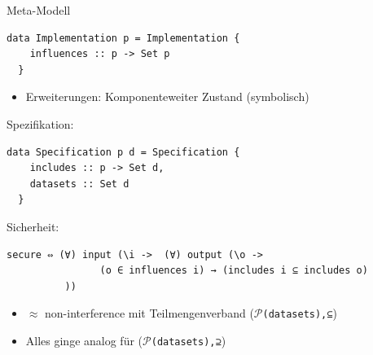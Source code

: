 \documentclass[18pt]{beamer}
\newcommand{\kit}[1]{\textcolor{kit-green100}{#1}}
\begin{document}
\begin{frame}[fragile,t]{Meta-Modell}
\begin{overprint}
\begin{minipage}[t]{5cm}
\begin{verbatim}
data Implementation p = Implementation {
    influences :: p -> Set p
  }
\end{verbatim}
\end{minipage}
\begin{minipage}[t]{6cm}
\begin{itemize}
  \item Erweiterungen: Komponenteweiter Zustand (symbolisch)
\end{itemize}
\end{minipage}
\kit{Spezifikation:}
\begin{minipage}[t]{8cm}
\begin{verbatim}
data Specification p d = Specification {
    includes :: p -> Set d,
    datasets :: Set d
  }
\end{verbatim}
\end{minipage}

\kit{Sicherheit:}
\begin{minipage}[t]{8cm}
\begin{verbatim}
secure ⇔ (∀) input (\i ->  (∀) output (\o ->
                (o ∈ influences i) → (includes i ⊆ includes o)
          ))
\end{verbatim}
\end{minipage}
\begin{itemize}
  \item $\approx$ non-interference mit Teilmengenverband \hfill ($\mathcal{P}$\texttt{(datasets),⊆})
  \item Alles ginge analog für \hfill ($\mathcal{P}$\texttt{(datasets),⊇})
\end{itemize}
\begin{center}

\end{center}
\end{overprint}

\end{frame}
\end{document}
